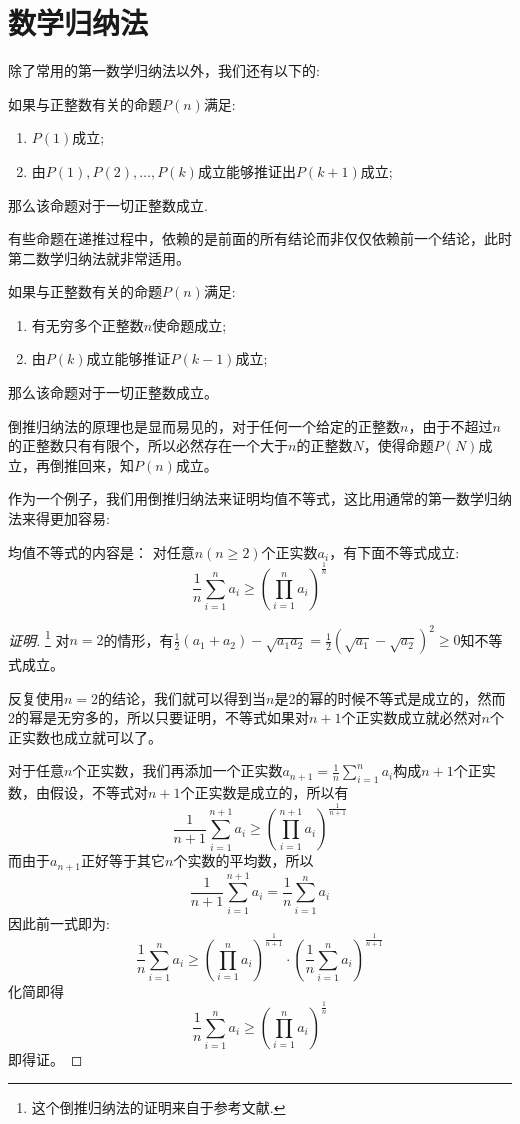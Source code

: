 
\section{数学归纳法}
\label{thm:mathematical-induction}
除了常用的第一数学归纳法以外，我们还有以下的:
\begin{principle}[第二数学归纳法]
如果与正整数有关的命题$P(n)$满足:
  \begin{enumerate}
  \item $P(1)$成立;
  \item 由$P(1),P(2),\dots,P(k)$成立能够推证出$P(k+1)$成立;
  \end{enumerate}
那么该命题对于一切正整数成立.
\end{principle}
有些命题在递推过程中，依赖的是前面的所有结论而非仅仅依赖前一个结论，此时第二数学归纳法就非常适用。
\begin{principle}[倒推归纳法]
如果与正整数有关的命题$P(n)$满足:
  \begin{enumerate}
  \item 有无穷多个正整数$n$使命题成立;
  \item 由$P(k)$成立能够推证$P(k-1)$成立;
  \end{enumerate}
那么该命题对于一切正整数成立。
\end{principle}
倒推归纳法的原理也是显而易见的，对于任何一个给定的正整数$n$，由于不超过$n$的正整数只有有限个，所以必然存在一个大于$n$的正整数$N$，使得命题$P(N)$成立，再倒推回来，知$P(n)$成立。

\begin{example}[均值不等式]
作为一个例子，我们用倒推归纳法来证明均值不等式，这比用通常的第一数学归纳法来得更加容易:

  均值不等式的内容是： 对任意$n(n\geqslant2)$个正实数$a_i$，有下面不等式成立:
\[ \frac{1}{n}\sum_{i=1}^na_i \geqslant \left( \prod_{i=1}^na_i \right)^{\frac{1}{n}} \]

\begin{proof}[证明]\footnote{这个倒推归纳法的证明来自于参考文献\cite{the-secret-of-inequality}.}
  对$n=2$的情形，有$\frac{1}{2}(a_1+a_2)-\sqrt{a_1a_2}=\frac{1}{2}(\sqrt{a_1}-\sqrt{a_2})^2\geqslant 0$知不等式成立。

 反复使用$n=2$的结论，我们就可以得到当$n$是2的幂的时候不等式是成立的，然而2的幂是无穷多的，所以只要证明，不等式如果对$n+1$个正实数成立就必然对$n$个正实数也成立就可以了。

对于任意$n$个正实数，我们再添加一个正实数$a_{n+1}=\frac{1}{n}\sum_{i=1}^na_i$构成$n+1$个正实数，由假设，不等式对$n+1$个正实数是成立的，所以有
\[
\frac{1}{n+1}\sum_{i=1}^{n+1}a_i \geqslant \left( \prod_{i=1}^{n+1}a_i \right)^{\frac{1}{n+1}}
\]
而由于$a_{n+1}$正好等于其它$n$个实数的平均数，所以
\[ \frac{1}{n+1}\sum_{i=1}^{n+1}a_i = \frac{1}{n}\sum_{i=1}^{n}a_i \]
因此前一式即为:
\[
\frac{1}{n}\sum_{i=1}^{n}a_i \geqslant \left( \prod_{i=1}^{n}a_i \right)^{\frac{1}{n+1}} \cdot \left( \frac{1}{n}\sum_{i=1}^na_i \right)^{\frac{1}{n+1}}
\]
化简即得
\[
\frac{1}{n}\sum_{i=1}^na_i \geqslant \left( \prod_{i=1}^na_i \right)^{\frac{1}{n}} 
\]
即得证。
\end{proof}
\end{example}

